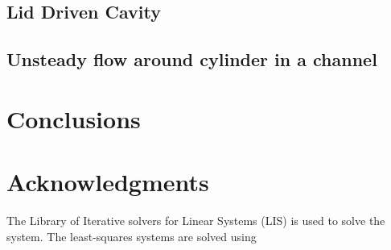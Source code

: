 \documentclass[final,3p,review]{elsarticle}
\begin{document}
	\subsection{Lid Driven Cavity} 
	
	\subsection{Unsteady flow around cylinder in a channel}
	
	\section{Conclusions}

	
	
	\section*{Acknowledgments}
	The Library of Iterative solvers for Linear Systems (LIS) \cite{LISSolver} is used to solve the system. The least-squares systems are solved using \cite{gsl} 
	
	
	
	
	

	
	
\end{document}
